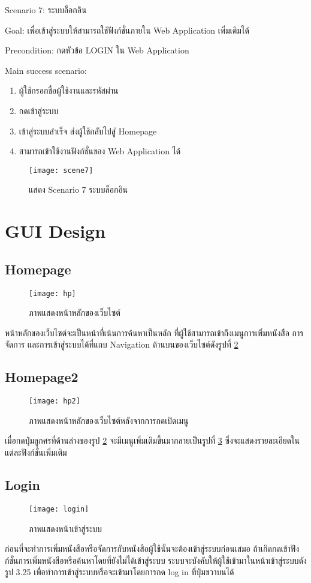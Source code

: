 Scenario 7: ระบบล็อกอิน

Goal: เพื่อเข้าสู่ระบบให้สามารถใช้ฟังก์ชั่นภายใน Web Application เพิ่มเติมได้

Precondition: กดหัวข้อ LOGIN ใน Web Application

Main success scenario:

\begin{enumerate}
    \item ผู้ใช้กรอกชื่อผู้ใช้งานและรหัสผ่าน
    \item กดเข้าสู่ระบบ
    \item เข้าสู่ระบบสำเร็จ ส่งผู้ใช้กลับไปสู่ Homepage
    \item สามารถเข้าใช้งานฟังก์ชั่นของ Web Application ได้
\end{enumerate}
\begin{figure}[H]
    \centering
    \texttt{[image: scene7]}
    \caption{แสดง Scenario 7 ระบบล็อกอิน}\label{fig:scene7}
\end{figure}

\section{GUI Design}

\subsection{Homepage}
\begin{figure}[H]
    \centering
    \texttt{[image: hp]}
    \caption{ภาพแสดงหน้าหลักของเว็บไซต์}\label{fig:hp}
\end{figure}
หน้าหลักของเว็บไซต์จะเป็นหน้าที่เน้นการค้นหาเป็นหลัก ที่ผู้ใช้สามารถเข้าถึงเมนูการเพิ่มหนังสือ การจัดการ และการเข้าสู่ระบบได้ที่แถบ Navigation ด้านบนของเว็บไซต์ดังรูปที่ \ref{fig:hp}

\subsection{Homepage2}
\begin{figure}[H]
    \centering
    \texttt{[image: hp2]}
    \caption{ภาพแสดงหน้าหลักของเว็บไซต์หลังจากการกดเปิดเมนู}\label{fig:hp2}
\end{figure}
เมื่อกดปุ่มลูกศรที่ด้านล่างของรูป \ref{fig:hp} จะมีเมนูเพิ่มเติมขึ้นมากลายเป็นรูปที่ \ref{fig:hp2} ซึ่งจะแสดงรายละเอียดในแต่ละฟังก์ชั่นเพิ่มเติม

\subsection{Login}
\begin{figure}[H]
    \centering
    \texttt{[image: login]}
    \caption{ภาพแสดงหน้าเข้าสู่ระบบ}\label{fig:scene7}
\end{figure}
ก่อนที่จะทำการเพิ่มหนังสือหรือจัดการกับหนังสือผู้ใช้นั้นจะต้องเข้าสู่ระบบก่อนเสมอ ถ้าเกิดกดเข้าฟังก์ชั่นการเพิ่มหนังสือหรือค้นหาโดยที่ยังไม่ได้เข้าสู่ระบบ ระบบจะบังคับให้ผู้ใช้เข้ามาในหน้าเข้าสู่ระบบดังรูป 3.25 เพื่อทำการเข้าสู่ระบบหรือจะเข้ามาโดยการกด log in ที่ปุ่มขวาบนได้

